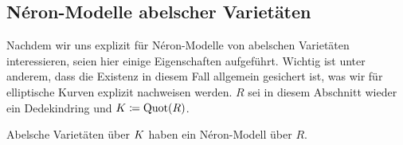 \subsection{Néron-Modelle abelscher Varietäten}
Nachdem wir uns explizit für Néron-Modelle von abelschen Varietäten
interessieren, seien hier einige Eigenschaften aufgeführt.
Wichtig ist unter anderem, dass die Existenz in diesem Fall allgemein
gesichert ist, was wir für elliptische Kurven explizit
nachweisen werden.
$R$ sei in diesem Abschnitt wieder ein Dedekindring und
$K\coloneqq\operatorname{Quot}(R)$.
\begin{Satz}\label{thm:exneronmodellabvarietaet}
  Abelsche Varietäten über $K$ haben ein Néron-Modell über $R$.
\end{Satz}


